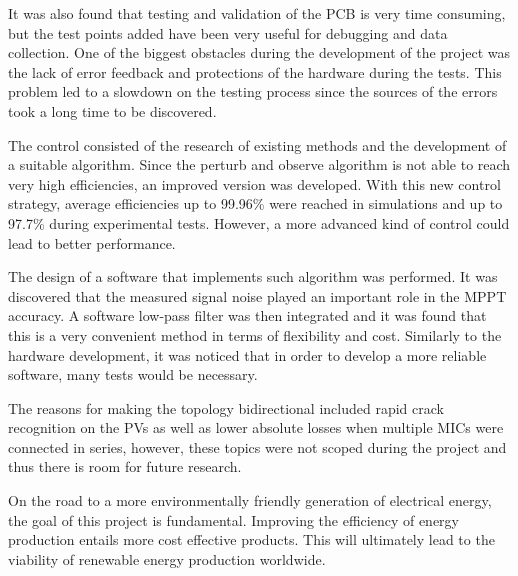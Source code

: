 It was also found that testing and validation of the PCB is very time consuming, but the test points added have been very useful for debugging and data collection. 
One of the biggest obstacles during the development of the project was the lack of error feedback and protections of the hardware during the tests. This problem led to a slowdown on the testing process since the sources of the errors took a long time to be discovered. 

The control consisted of the research of existing methods and the development of a suitable algorithm. Since the perturb and observe algorithm is not able to reach very high efficiencies, an improved version was developed. With this new control strategy, average efficiencies up to 99.96\% were reached in simulations and up to 97.7\% during experimental tests. However, a more advanced kind of control could lead to better performance.

The design of a software that implements such algorithm was performed. It was discovered that the measured signal noise played an important role in the MPPT accuracy. A software low-pass filter was then integrated and it was found that this is a very convenient method in terms of flexibility and cost. 
Similarly to the hardware development, it was noticed that in order to develop a more reliable software, many tests would be necessary.

The reasons for making the topology bidirectional included rapid crack recognition on the PVs as well as lower absolute losses when multiple MICs were connected in series, however, these topics were not scoped during the project and thus there is room for future research.

On the road to a more environmentally friendly generation of electrical energy, the goal of this project is fundamental. Improving the efficiency of energy production entails more cost effective products. This will ultimately lead to the viability of renewable energy production worldwide.